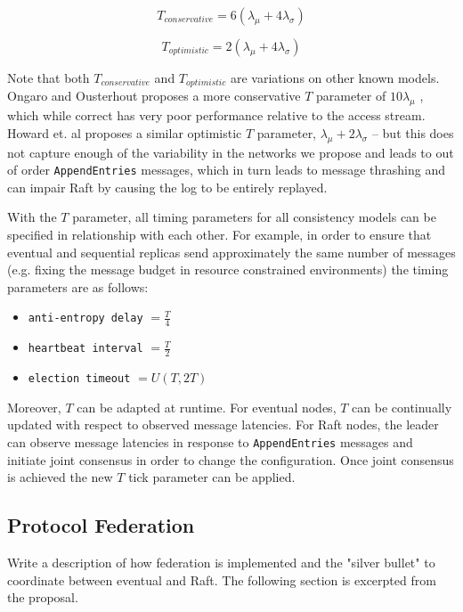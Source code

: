 \documentclass[10pt,conference,compsocconf,letterpaper]{IEEEtran}
\begin{document}
\begin{equation}
    T_{conservative} = 6(\lambda_{\mu} + 4\lambda_{\sigma})
\end{equation}

\begin{equation}
    T_{optimistic} = 2(\lambda_{\mu} + 4\lambda_{\sigma})
\end{equation}

Note that both $T_{conservative}$ and $T_{optimistic}$ are variations on other known models. Ongaro and Ousterhout proposes a more conservative $T$ parameter of $10\lambda_{\mu}$ \cite{ongaro_search_2014}, which while correct has very poor performance relative to the access stream. Howard et. al proposes a similar optimistic $T$ parameter, $\lambda_{\mu} + 2\lambda_{\sigma}$ \cite{howard_raft_2015} -- but this does not capture enough of the variability in the networks we propose and leads to out of order \texttt{AppendEntries} messages, which in turn leads to message thrashing and can impair Raft by causing the log to be entirely replayed.

With the $T$ parameter, all timing parameters for all consistency models can be specified in relationship with each other. For example, in order to ensure that eventual and sequential replicas send approximately the same number of messages (e.g. fixing the message budget in resource constrained environments) the timing parameters are as follows:

\begin{itemize}
    \item \texttt{anti-entropy delay} $= \frac{T}{4}$
    \item \texttt{heartbeat interval} $= \frac{T}{2}$
    \item \texttt{election timeout} $= U(T, 2T)$
\end{itemize}

Moreover, $T$ can be adapted at runtime. For eventual nodes, $T$ can be continually updated with respect to observed message latencies. For Raft nodes, the leader can observe message latencies in response to \texttt{AppendEntries} messages and initiate joint consensus in order to change the configuration. Once joint consensus is achieved the new $T$ tick parameter can be applied.

\subsection{Protocol Federation}

Write a description of how federation is implemented and the "silver bullet" to coordinate between eventual and Raft. The following section is excerpted from the proposal.
\end{document}

